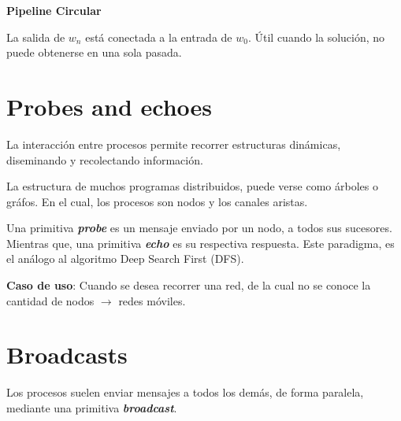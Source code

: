 \documentclass[a4paper, 10pt]{report}
\begin{document}
\begin{multicols}{2}

    \textbf{Pipeline Circular}
    
    La salida de $w_n$ está conectada a la entrada de $w_0$. Útil cuando la solución, no puede obtenerse en una sola pasada.
    
    \columnbreak
\end{multicols}

\section{Probes and echoes}

La interacción entre procesos permite recorrer estructuras dinámicas, diseminando y recolectando información.

La estructura de muchos programas distribuidos, puede verse como árboles o gráfos. En el cual, los procesos son nodos y los canales aristas.

Una primitiva \textbf{\emph{probe}} es un mensaje enviado por un nodo, a todos sus sucesores. Mientras que, una primitiva \textbf{\emph{echo}} es su respectiva respuesta. Este paradigma, es el análogo al algoritmo Deep Search First (DFS).

\textbf{Caso de uso}: Cuando se desea recorrer una red, de la cual no se conoce la cantidad de nodos $\rightarrow$ redes móviles.

\section{Broadcasts}

Los procesos suelen enviar mensajes a todos los demás, de forma paralela, mediante una primitiva \textbf{\emph{broadcast}}. 
\end{document}
